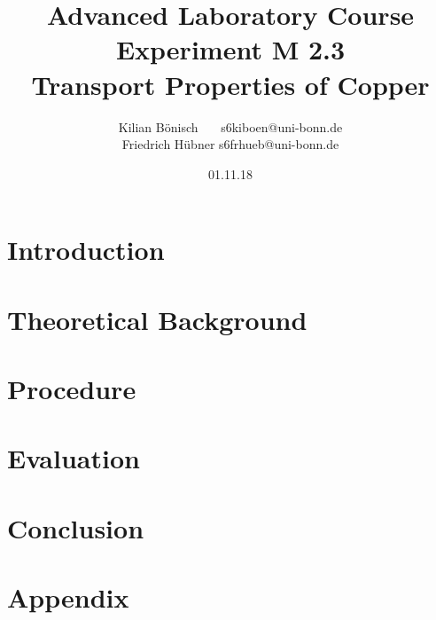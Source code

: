 \documentclass{article}
\begin{document}
\setlength{\parindent}{0em}   %
\title{Advanced Laboratory Course\\Experiment M 2.3\\Transport Properties of Copper}
\author{Kilian Bönisch \ \ \ \qquad s6kiboen@uni-bonn.de \\
  Friedrich Hübner \qquad s6frhueb@uni-bonn.de }
\date{01.11.18}

\maketitle
\thispagestyle{empty}

\newpage

\thispagestyle{empty}

\tableofcontents

\newpage

\section{Introduction}



\section{Theoretical Background}



\section{Procedure}



\section{Evaluation}



\newpage

\section{Conclusion}



\FloatBarrier

\newpage

\printbibliography

\newpage

\section{Appendix}

\end{document}
